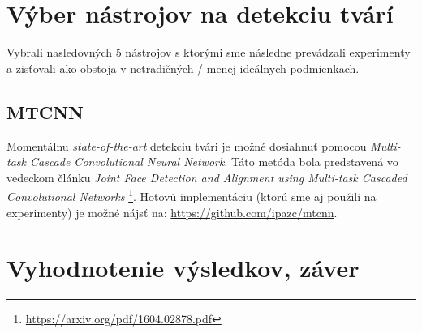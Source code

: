 \documentclass[]{article}
\begin{document}
	\section{Výber nástrojov na detekciu tvárí}
	
	Vybrali nasledovných 5 nástrojov s ktorými sme následne prevádzali experimenty a zisťovali ako obstoja v netradičných / menej ideálnych podmienkach.
	
	\subsection{MTCNN}
	Momentálnu \textit{state-of-the-art} detekciu tvári je možné dosiahnuť pomocou \textit{Multi-task Cascade Convolutional Neural Network}. Táto metóda bola predstavená vo vedeckom článku \textit{Joint Face Detection and Alignment using Multi-task Cascaded Convolutional Networks} \footnote{\url{https://arxiv.org/pdf/1604.02878.pdf}}. Hotovú implementáciu (ktorú sme aj použili na experimenty) je možné nájsť na: \url{https://github.com/ipazc/mtcnn}.
	
	\section{Vyhodnotenie výsledkov, záver}
	
	
\end{document}
